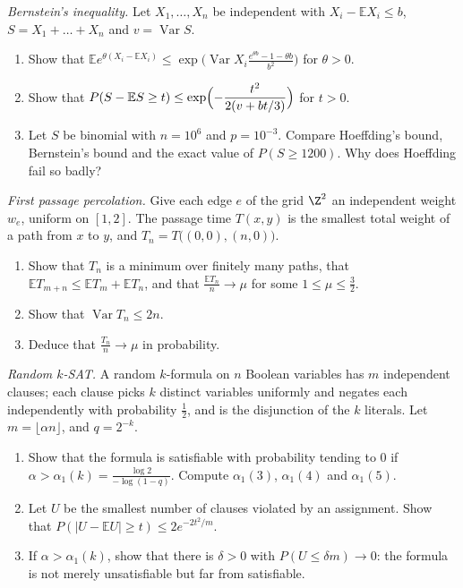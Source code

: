 \begin{exercise}[$\star\star$]\label{pb:bernstein}
\emph{Bernstein's inequality.} Let $X_1,\dots,X_n$ be independent with $X_i-\mathbb EX_i\le b$, $S=X_1+\dots+X_n$ and $v=\operatorname{Var}S$.
\begin{enumerate}[label=(\alph*)]
\item Show that $\mathbb Ee^{\theta(X_i-\mathbb EX_i)}\le\exp\bigl(\operatorname{Var}X_i\frac{e^{\theta b}-1-\theta b}{b^2}\bigr)$ for $\theta>0$.
\item Show that $P(S-\mathbb ES\ge t)\le\exp\Bigl(-\dfrac{t^2}{2(v+bt/3)}\Bigr)$ for $t>0$.
\item Let $S$ be binomial with $n=10^6$ and $p=10^{-3}$. Compare Hoeffding's bound, Bernstein's bound and the exact value of $P(S\ge1200)$. Why does Hoeffding fail so
badly?
\end{enumerate}
\end{exercise}

\begin{exercise}[$\star\star$]\label{pb:fpp}
\emph{First passage percolation.} Give each edge $e$ of the grid $\Z^2$ an independent weight $w_e$, uniform on $[1,2]$. The passage time $T(x,y)$ is the smallest total
weight of a path from $x$ to $y$, and $T_n=T\bigl((0,0),(n,0)\bigr)$.
\begin{enumerate}[label=(\alph*)]
\item Show that $T_n$ is a minimum over finitely many paths, that $\mathbb ET_{m+n}\le\mathbb ET_m+\mathbb ET_n$, and that $\frac{\mathbb ET_n}n\to\mu$ for some $1\le\mu\le\frac32$.
\item Show that $\operatorname{Var}T_n\le2n$.
\item Deduce that $\frac{T_n}n\to\mu$ in probability.
\end{enumerate}
\end{exercise}

\begin{exercise}[$\star\star$]\label{pb:ksat}
\emph{Random $k$-SAT.} A random $k$-formula on $n$ Boolean variables has $m$ independent clauses; each clause picks $k$ distinct variables uniformly and negates each
independently with probability $\frac12$, and is the disjunction of the $k$ literals. Let $m=\lfloor\alpha n\rfloor$, and $q=2^{-k}$.
\begin{enumerate}[label=(\alph*)]
\item Show that the formula is satisfiable with probability tending to $0$ if $\alpha>\alpha_1(k)=\frac{\log2}{-\log(1-q)}$. Compute $\alpha_1(3)$, $\alpha_1(4)$ and $\alpha_1(5)$.
\item Let $U$ be the smallest number of clauses violated by an assignment. Show that $P(|U-\mathbb EU|\ge t)\le2e^{-2t^2/m}$.
\item If $\alpha>\alpha_1(k)$, show that there is $\delta>0$ with $P(U\le\delta m)\to0$: the formula is not merely unsatisfiable but far from satisfiable.
\end{enumerate}
\end{exercise}

